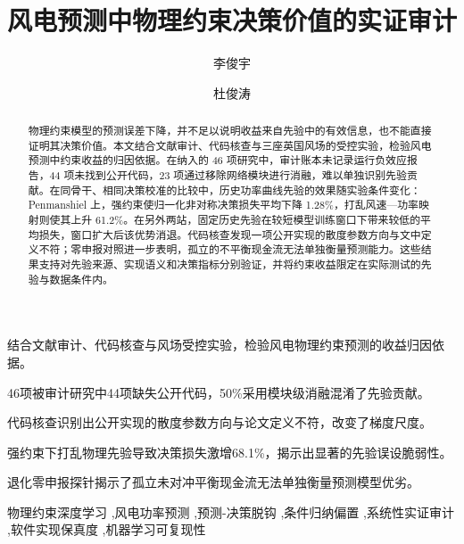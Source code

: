 \documentclass[3p,twocolumn]{elsarticle}
\theoremstyle{definition}
\theoremstyle{remark}
\begin{document}
\begin{frontmatter}

\title{风电预测中物理约束决策价值的实证审计}

\author[1]{李俊宇}

\author[1]{杜俊涛}

\address[1]{智能电力系统与计算能源交叉研究组，中国}


\begin{highlights}
\item 结合文献审计、代码核查与风场受控实验，检验风电物理约束预测的收益归因依据。
\item 46项被审计研究中44项缺失公开代码，50\%采用模块级消融混淆了先验贡献。
\item 代码核查识别出公开实现的散度参数方向与论文定义不符，改变了梯度尺度。
\item 强约束下打乱物理先验导致决策损失激增68.1\%，揭示出显著的先验误设脆弱性。
\item 退化零申报探针揭示了孤立未对冲平衡现金流无法单独衡量预测模型优劣。
\end{highlights}

\begin{abstract}
物理约束模型的预测误差下降，并不足以说明收益来自先验中的有效信息，也不能直接证明其决策价值。本文结合文献审计、代码核查与三座英国风场的受控实验，检验风电预测中约束收益的归因依据。在纳入的 46 项研究中，审计账本未记录运行负效应报告，44 项未找到公开代码，23 项通过移除网络模块进行消融，难以单独识别先验贡献。在同骨干、相同决策校准的比较中，历史功率曲线先验的效果随实验条件变化：Penmanshiel 上，强约束使归一化非对称决策损失平均下降 1.28\%，打乱风速—功率映射则使其上升 61.2\%。在另外两站，固定历史先验在较短模型训练窗口下带来较低的平均损失，窗口扩大后该优势消退。代码核查发现一项公开实现的散度参数方向与文中定义不符；零申报对照进一步表明，孤立的不平衡现金流无法单独衡量预测能力。这些结果支持对先验来源、实现语义和决策指标分别验证，并将约束收益限定在实际测试的先验与数据条件内。
\end{abstract}

\begin{keyword}
物理约束深度学习 \sep 风电功率预测 \sep 预测-决策脱钩 \sep 条件归纳偏置 \sep 系统性实证审计 \sep 软件实现保真度 \sep 机器学习可复现性
\end{keyword}

\end{frontmatter}










\end{document}
